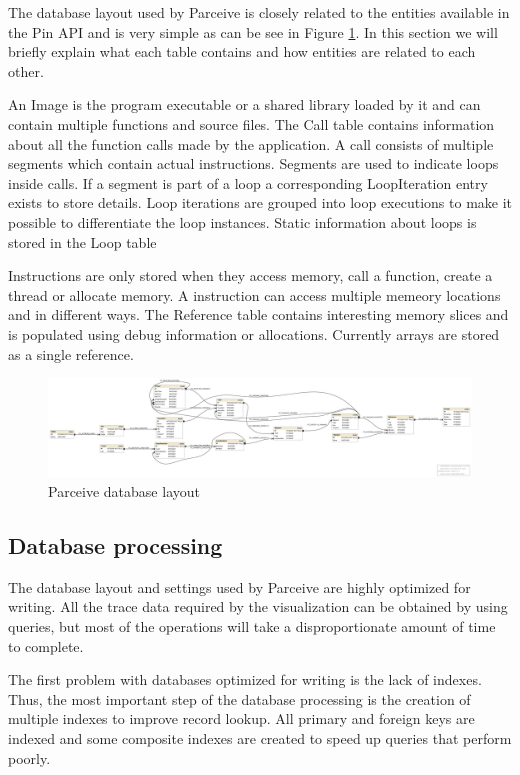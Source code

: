 The database layout used by Parceive is closely related to the entities available in the Pin API and is very simple as can be see in Figure \ref{parceive:layout}. In this section we will briefly explain what each table contains and how entities are related to each other.

An Image is the program executable or a shared library loaded by it and can contain multiple functions and source files. The Call table contains information about all the function calls made by the application. A call consists of multiple segments which contain actual instructions. Segments are used to indicate loops inside calls. If a segment is part of a loop a corresponding LoopIteration entry exists to store details. Loop iterations are grouped into loop executions to make it possible to differentiate the loop instances. Static information about loops is stored in the Loop table

Instructions are only stored when they access memory, call a function, create a thread or allocate memory. A instruction can access multiple memeory locations and in different ways. The Reference table contains interesting memory slices and is populated using debug information or allocations. Currently arrays are stored as a single reference.

\begin{figure}
	\centering
	\includegraphics[width=1\textwidth]{parceive-schema}
	\caption{Parceive database layout}
	\label{parceive:layout}
\end{figure}

\subsection{Database processing}
\label{dataprocessing}

The database layout and settings used by Parceive are highly optimized for writing. All the trace data required by the visualization can be obtained by using queries, but most of the operations will take a disproportionate amount of time to complete.

The first problem with databases optimized for writing is the lack of indexes. Thus, the most important step of the database processing is the creation of multiple indexes to improve record lookup. All primary and foreign keys are indexed and some composite indexes are created to speed up queries that perform poorly.


